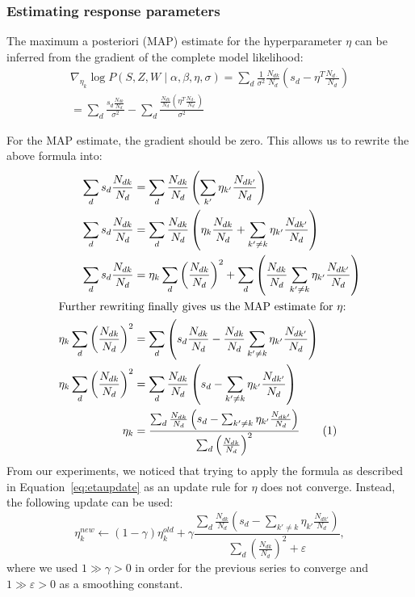 \documentclass[a4paper,10pt]{article}
\renewcommand{\epsilon}{\varepsilon}
\newcommand{\numberthis}{\addtocounter{equation}{1}\tag{\theequation}}
\begin{document}
\subsubsection{Estimating response parameters}
The maximum a posteriori (MAP) estimate for the hyperparameter \(\eta\)  can be inferred from the gradient of the complete model likelihood:
\begin{equation}
\begin{gathered}
\nabla_{\eta_k} \log P(S, Z, W \mid \alpha, \beta, \eta, \sigma) = \sum_d \frac{1}{\sigma^2} \frac{N_{dk}}{N_d} \left( s_d - \eta^T \frac{N_{d\cdot}}{N_d}\right) \\
 = \sum_d \frac{s_d \frac{N_{dk}}{N_d} }{\sigma^2} - \sum_d \frac{ \frac{N_{dk}}{N_d} \left( \eta^T \frac{N_{d\cdot}}{N_d} \right) }{\sigma^2}
\end{gathered}
\end{equation}

For the MAP estimate, the gradient should be zero.
This allows us to rewrite the above formula into:
\begin{align*}
\sum_d s_d \frac{N_{dk}}{N_d} &= \sum_d \frac{N_{dk}}{N_d} \left( \sum_{k'} \eta_{k'} \frac{N_{dk'}}{N_d} \right)\\
\sum_d s_d \frac{N_{dk}}{N_d} &= \sum_d \frac{N_{dk}}{N_d} \left( \eta_k \frac{N_{dk}}{N_d} + \sum_{k' \ne k} \eta_{k'} \frac{N_{dk'}}{N_d} \right) \\
\sum_d s_d \frac{N_{dk}}{N_d} &= \eta_k \sum_d \left( \frac{N_{dk}}{N_d}  \right)^2 + \sum_d \left( \frac{N_{dk}}{N_d} \sum_{k' \ne k} \eta_{k'} \frac{N_{dk'}}{N_d} \right) \\
\intertext{Further rewriting finally gives us the MAP estimate for \(\eta\):}
\eta_k \sum_d \left( \frac{N_{dk}}{N_d}  \right)^2  &=\sum_d \left( s_d \frac{N_{dk}}{N_d} - \frac{N_{dk}}{N_d} \sum_{k' \ne k} \eta_{k'} \frac{N_{dk'}}{N_d} \right)\\
\eta_k \sum_d \left( \frac{N_{dk}}{N_d}  \right)^2 &=  \sum_d \frac{N_{dk}}{N_d} \left( s_d - \sum_{k' \ne k} \eta_{k'} \frac{N_{dk'}}{N_d} \right)\\
\eta_k &= \frac{\sum_d \frac{N_{dk}}{N_d} \left( s_d - \sum_{k' \ne k} \eta_{k'} \frac{N_{dk'}}{N_d} \right)}{\sum_d \left( \frac{N_{dk}}{N_d}  \right)^2} \numberthis \label{eq:etaupdate}
\end{align*}
From our experiments, we noticed that trying to apply the formula as described in Equation~\ref{eq:etaupdate} as an update rule for \(\eta\) does not converge.
Instead, the following update can be used:
\begin{equation}
\eta_k^{new} \leftarrow (1 - \gamma) \eta_k^{old} + \gamma \frac{\sum_d \frac{N_{dk}}{N_d} \left( s_d - \sum_{k' \ne k} \eta_{k'} \frac{N_{dk'}}{N_d} \right)}{\sum_d \left( \frac{N_{dk}}{N_d}  \right)^2 + \epsilon},
\end{equation}
where we used $1 \gg \gamma > 0$ in order for the previous series to converge and $1 \gg \epsilon > 0$ as a smoothing constant.
\end{document}
